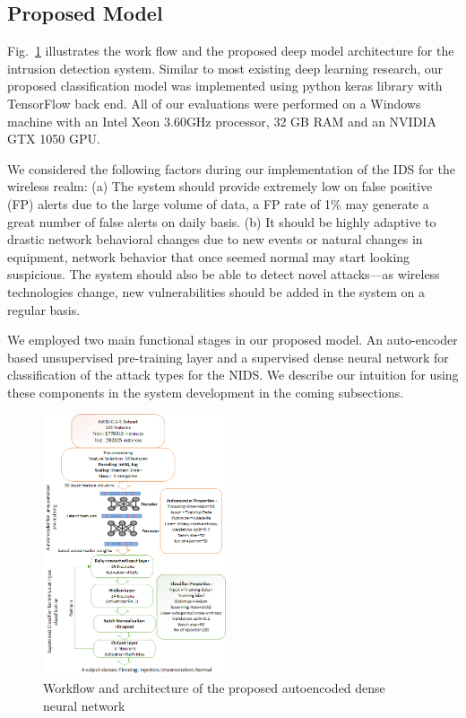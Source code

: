 \documentclass[letterpaper, 10pt, conference]{ieeeconf} %
\newcommand{\fig}[1]{Fig.~\ref{#1}}
\begin{document}


\subsection{Proposed Model}
 
 
\fig{fig:Architecture} illustrates the work flow and the proposed deep model architecture for the intrusion detection system. Similar to most existing deep learning research, our proposed classification model was implemented using python keras library \cite{keras} with TensorFlow back end. All of our evaluations were performed on a Windows machine with an Intel Xeon 3.60GHz processor, 32 GB RAM and an NVIDIA GTX 1050 GPU. 

We considered the following factors during our implementation of the IDS for the wireless realm:
(a) The system should provide extremely low on false positive (FP) alerts due to the large volume of data, a FP rate of 1\% may generate a great number of false alerts on daily basis.
(b) It should be highly adaptive to drastic network behavioral changes due to new events or natural changes in equipment, network behavior that once seemed normal may start looking suspicious. The system should also be able to detect novel attacks—as wireless technologies change, new vulnerabilities should be added in the system on a regular basis.

We employed two main functional stages in our proposed model. An auto-encoder based unsupervised pre-training layer and a supervised dense neural network for classification of the attack types for the NIDS. We describe our intuition for using these components in the system development in the coming subsections.

 \begin{figure}
      \centering
\includegraphics[width=0.48\textwidth]{Figures/NIDS_Autoencoder_Architecture.png}
\caption{Workflow and architecture of the proposed  autoencoded dense neural network}
      \label{fig:Architecture}
    \end{figure}
%
\end{document}
